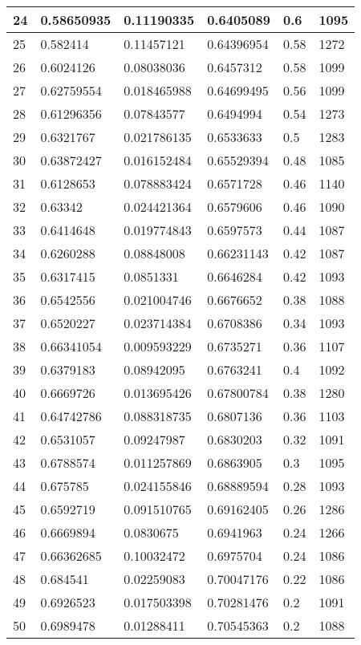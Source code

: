\begin{longtable}{|l|l|l|l|l|l|}
24 & 0.58650935 & 0.11190335 & 0.6405089 & 0.6 & 1095 \\ \hline 
25 & 0.582414 & 0.11457121 & 0.64396954 & 0.58 & 1272 \\ \hline 
26 & 0.6024126 & 0.08038036 & 0.6457312 & 0.58 & 1099 \\ \hline 
27 & 0.62759554 & 0.018465988 & 0.64699495 & 0.56 & 1099 \\ \hline 
28 & 0.61296356 & 0.07843577 & 0.6494994 & 0.54 & 1273 \\ \hline 
29 & 0.6321767 & 0.021786135 & 0.6533633 & 0.5 & 1283 \\ \hline 
30 & 0.63872427 & 0.016152484 & 0.65529394 & 0.48 & 1085 \\ \hline 
31 & 0.6128653 & 0.078883424 & 0.6571728 & 0.46 & 1140 \\ \hline 
32 & 0.63342 & 0.024421364 & 0.6579606 & 0.46 & 1090 \\ \hline 
33 & 0.6414648 & 0.019774843 & 0.6597573 & 0.44 & 1087 \\ \hline 
34 & 0.6260288 & 0.08848008 & 0.66231143 & 0.42 & 1087 \\ \hline 
35 & 0.6317415 & 0.0851331 & 0.6646284 & 0.42 & 1093 \\ \hline 
36 & 0.6542556 & 0.021004746 & 0.6676652 & 0.38 & 1088 \\ \hline 
37 & 0.6520227 & 0.023714384 & 0.6708386 & 0.34 & 1093 \\ \hline 
38 & 0.66341054 & 0.009593229 & 0.6735271 & 0.36 & 1107 \\ \hline 
39 & 0.6379183 & 0.08942095 & 0.6763241 & 0.4 & 1092 \\ \hline 
40 & 0.6669726 & 0.013695426 & 0.67800784 & 0.38 & 1280 \\ \hline 
41 & 0.64742786 & 0.088318735 & 0.6807136 & 0.36 & 1103 \\ \hline 
42 & 0.6531057 & 0.09247987 & 0.6830203 & 0.32 & 1091 \\ \hline 
43 & 0.6788574 & 0.011257869 & 0.6863905 & 0.3 & 1095 \\ \hline 
44 & 0.675785 & 0.024155846 & 0.68889594 & 0.28 & 1093 \\ \hline 
45 & 0.6592719 & 0.091510765 & 0.69162405 & 0.26 & 1286 \\ \hline 
46 & 0.6669894 & 0.0830675 & 0.6941963 & 0.24 & 1266 \\ \hline 
47 & 0.66362685 & 0.10032472 & 0.6975704 & 0.24 & 1086 \\ \hline 
48 & 0.684541 & 0.02259083 & 0.70047176 & 0.22 & 1086 \\ \hline 
49 & 0.6926523 & 0.017503398 & 0.70281476 & 0.2 & 1091 \\ \hline 
50 & 0.6989478 & 0.01288411 & 0.70545363 & 0.2 & 1088 \\ \hline 
\end{longtable}